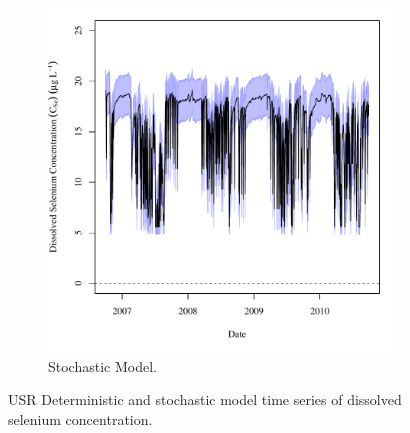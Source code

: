 \begin{linenumbers}
\begin{landscape}
\begin{figure}
\begin{subfigure}{0.7\textwidth}
			\includegraphics[width=\tableCustomSize]{"Figures/Results_USR/Stochastic/c TS HRC"}
			\caption{Stochastic Model.}
		\end{subfigure}
		\caption{USR Deterministic and stochastic model time series of dissolved selenium concentration.}
	\end{figure}
\end{landscape}


\end{linenumbers}
